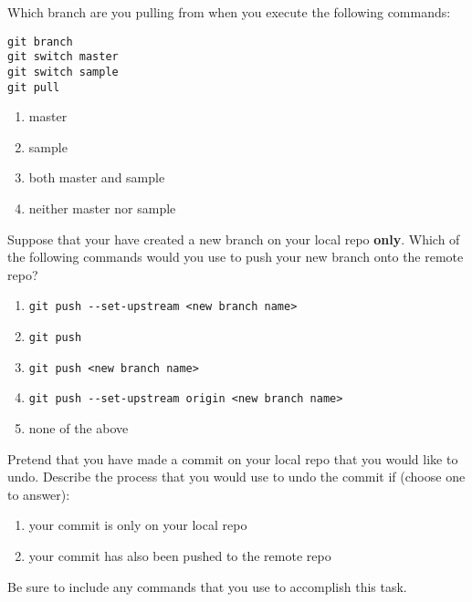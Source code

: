 \documentclass[12pt,fleqn]{examtst}
\begin{document}
\newpage
\noindent
\begin{minipage}{\textwidth}

Which branch are you pulling from when you execute the following commands:

\begin{lstlisting}
git branch
git switch master
git switch sample
git pull
\end{lstlisting}

\begin{enumerate}
    \item master
    \item sample
    \item both master and sample
    \item neither master nor sample
\end{enumerate}
\rule{0cm}{3cm}

Suppose that your have created a new branch on your local repo \textbf{only}. Which of the following commands would you use to push your new branch onto the remote repo?

\begin{enumerate}
    \item \lstinline{git push --set-upstream <new branch name>}
    \item \lstinline{git push}
    \item \lstinline{git push <new branch name>}
    \item \lstinline{git push --set-upstream origin <new branch name>}
    \item none of the above
\end{enumerate}
\rule{0cm}{3cm}

\end{minipage}


\newpage
\noindent
\begin{minipage}{\textwidth}

 Pretend that you have made a commit on your local repo that you would like to undo. Describe the process that you would use to undo the commit if (choose one to answer):

\begin{enumerate}
    \item your commit is only on your local repo
    \item your commit has also been pushed to the remote repo
\end{enumerate}

Be sure to include any commands that you use to accomplish this task.

\rule{0cm}{14cm}

\end{minipage}
\end{document}
